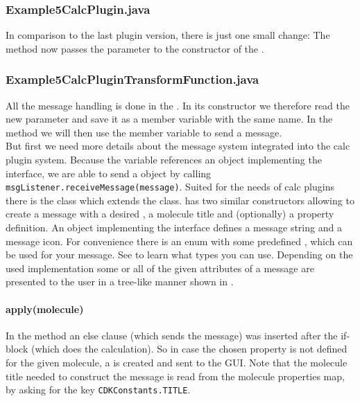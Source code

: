   \subsubsection{Example5CalcPlugin.java}
  In comparison to the last plugin version, there is just one small change:
  The  method
  now passes the  parameter to the constructor of
  the .

  \subsubsection{Example5CalcPluginTransformFunction.java}
  All the message handling is done in the .
  In its constructor we therefore read the new 
  parameter and save it as a member variable with the same name.
  In the  method we will
  then use the  member variable to send a message.\\
  But first we need more details about the message system integrated into the calc plugin system.
  Because the  variable references an object implementing the  interface,
  we are able to send a  object by calling \verb+msgListener.receiveMessage(message)+.
  Suited for the needs of calc plugins there is the  class which extends the  class.
   has two similar constructors allowing to create
  a message with a desired , a molecule title and (optionally) a property definition.
  An object implementing the  interface defines a message string and a message icon.
  For convenience there is an enum  with some predefined , which can be used for your message.
  See  to learn what types you can use.
  Depending on the used  implementation some or all of the given attributes
  of a message are presented to the user in a tree-like manner shown in .

    \paragraph{apply(molecule)}
    In the  method an else clause (which sends the message) was inserted
    after the if-block (which does the calculation).
    So in case the chosen property is not defined for the given molecule,
    a  is created and sent to the GUI.
    Note that the molecule title needed to construct the message is read from the molecule properties map,
    by asking for the key \verb+CDKConstants.TITLE+.

